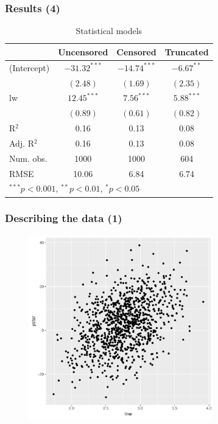 \documentclass{beamer}
\newcommand{\1}{\mathbb{1}}
\begin{document}
\begin{frame}\frametitle{Results (4)}
\begin{table}
\begin{center}
\begin{tabular}{l c c c }
\hline
 & Uncensored & Censored & Truncated \\
\hline
(Intercept) & $-31.32^{***}$ & $-14.74^{***}$ & $-6.67^{**}$ \\
            & $(2.48)$       & $(1.69)$       & $(2.35)$     \\
lw          & $12.45^{***}$  & $7.56^{***}$   & $5.88^{***}$             \\
            & $(0.89)$       & $(0.61)$       & $(0.82)$              \\
\hline
R$^2$       & 0.16           & 0.13           & 0.08         \\
Adj. R$^2$  & 0.16           & 0.13           & 0.08         \\
Num. obs.   & 1000           & 1000           & 604          \\
RMSE        & 10.06          & 6.84           & 6.74         \\
\hline
\multicolumn{4}{l}{\scriptsize{$^{***}p<0.001$, $^{**}p<0.01$, $^*p<0.05$}}
\end{tabular}
\caption{Statistical models}
\label{table:coefficients}
\end{center}
\end{table}
\end{frame}

\begin{frame}\frametitle{Describing the data (1)}
\begin{figure}
\includegraphics[width = 8cm]{plot/scatter1}
\end{figure}
\end{frame}
\end{document}
